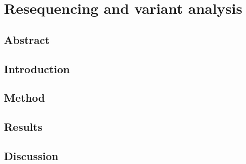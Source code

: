 \section{Resequencing and variant analysis}

    \subsection{Abstract}

        \noindent

    \subsection{Introduction}

        \noindent

    \subsection{Method}

        \noindent

    \subsection{Results}

        \noindent

    \subsection{Discussion}

        \noindent
